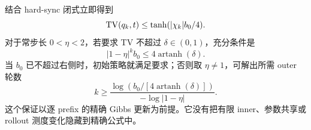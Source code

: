 结合 hard-sync 闭式立即得到
\begin{equation*}
 \operatorname{TV}(q_k,t)\leq\tanh(|\chi_k|b_0/4).
\end{equation*}
对于常步长 $0<\eta<2$，若要求 TV 不超过 $\delta\in(0,1)$，充分条件是
\begin{equation*}
 |1-\eta|^k b_0\leq4\operatorname{artanh}(\delta).
\end{equation*}
当 $b_0$ 已不超过右侧时，初始策略就满足要求；否则取 $\eta\neq1$，可解出所需 outer 轮数
\begin{equation*}
 k\geq
 \frac{\log\!\left(b_0/[4\operatorname{artanh}(\delta)]\right)}
 {-\log|1-\eta|}.
\end{equation*}
这个保证以逐 prefix 的精确 Gibbs 更新为前提。它没有把有限 inner、参数共享或 rollout 测度变化隐藏到精确公式中。

